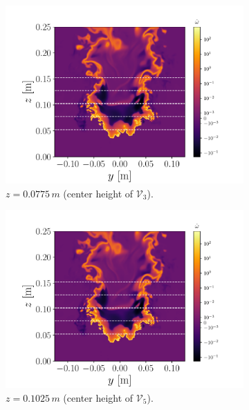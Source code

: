 \documentclass[review]{elsarticle}
\begin{document}
\begin{figure}[!tbp]
\begin{subfigure}[t]{0.48\textwidth}
    \includegraphics[page=3,width=\textwidth]{./figs/src_pv.pdf}%
    \caption{$z=0.0775\,\unit{m}$ (center height of $\mathcal{V}_{3}$).}%
 \end{subfigure}\hfill%
  \begin{subfigure}[t]{0.48\textwidth}%
    \includegraphics[page=4,width=\textwidth]{./figs/src_pv.pdf}%
    \caption{$z=0.1025\,\unit{m}$ (center height of $\mathcal{V}_{5}$).}%
  \end{subfigure}\\%
  \begin{subfigure}[t]{0.48\textwidth}%

\end{subfigure}
\end{figure}
\end{document}
